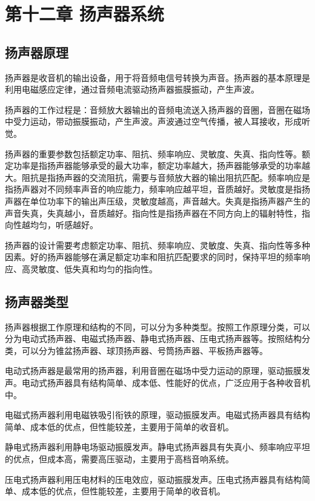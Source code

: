 \documentclass[12pt,UTF8]{ctexbook}
\begin{document}
\chapter{第十二章 扬声器系统}

\section{扬声器原理}

扬声器是收音机的输出设备，用于将音频电信号转换为声音。扬声器的基本原理是利用电磁感应定律，通过音频电流驱动扬声器振膜振动，产生声波。

扬声器的工作过程是：音频放大器输出的音频电流送入扬声器的音圈，音圈在磁场中受力运动，带动振膜振动，产生声波。声波通过空气传播，被人耳接收，形成听觉。

扬声器的重要参数包括额定功率、阻抗、频率响应、灵敏度、失真、指向性等。额定功率是指扬声器能够承受的最大功率，额定功率越大，扬声器能够承受的功率越大。阻抗是指扬声器的交流阻抗，需要与音频放大器的输出阻抗匹配。频率响应是指扬声器对不同频率声音的响应能力，频率响应越平坦，音质越好。灵敏度是指扬声器在单位功率下的输出声压级，灵敏度越高，声音越大。失真是指扬声器产生的声音失真，失真越小，音质越好。指向性是指扬声器在不同方向上的辐射特性，指向性越均匀，听感越好。

扬声器的设计需要考虑额定功率、阻抗、频率响应、灵敏度、失真、指向性等多种因素。好的扬声器能够在满足额定功率和阻抗匹配要求的同时，保持平坦的频率响应、高灵敏度、低失真和均匀的指向性。

\section{扬声器类型}

扬声器根据工作原理和结构的不同，可以分为多种类型。按照工作原理分类，可以分为电动式扬声器、电磁式扬声器、静电式扬声器、压电式扬声器等。按照结构分类，可以分为锥盆扬声器、球顶扬声器、号筒扬声器、平板扬声器等。

电动式扬声器是最常用的扬声器，利用音圈在磁场中受力运动的原理，驱动振膜发声。电动式扬声器具有结构简单、成本低、性能好的优点，广泛应用于各种收音机中。

电磁式扬声器利用电磁铁吸引衔铁的原理，驱动振膜发声。电磁式扬声器具有结构简单、成本低的优点，但性能较差，主要用于简单的收音机。

静电式扬声器利用静电场驱动振膜发声。静电式扬声器具有失真小、频率响应平坦的优点，但成本高，需要高压驱动，主要用于高档音响系统。

压电式扬声器利用压电材料的压电效应，驱动振膜发声。压电式扬声器具有结构简单、成本低的优点，但性能较差，主要用于简单的收音机。
\end{document}
